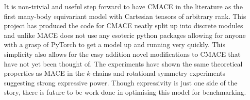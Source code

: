 It is non-trivial and useful step forward to have CMACE in the literature as the first many-body equivariant model with Cartesian tensors of arbitrary rank. This project has produced the code for CMACE neatly split up into discrete modules and unlike MACE does not use any esoteric python packages allowing for anyone with a grasp of PyTorch to get a model up and running very quickly. This simplicity also allows for the easy addition novel modifications to CMACE that have not yet been thought of. The experiments have shown the same theoretical properties as MACE in the $k$-chains and rotational symmetry experiments suggesting strong expressive power. Though expressivity is just one side of the story, there is future to be work done in optimising this model for benchmarking.




